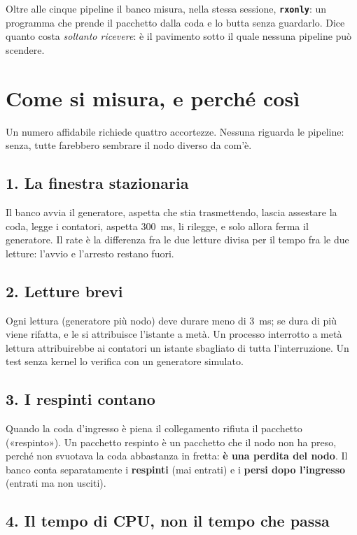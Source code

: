 \documentclass[11pt,a4paper,oneside]{report}
\begin{document}
Oltre alle cinque pipeline il banco misura, nella stessa sessione,
\textbf{\texttt{rxonly}}: un programma che prende il pacchetto dalla coda e lo
butta senza guardarlo. Dice quanto costa \emph{soltanto ricevere}: è il pavimento
sotto il quale nessuna pipeline può scendere.

\section{Come si misura, e perché così}

Un numero affidabile richiede quattro accortezze. Nessuna riguarda le pipeline:
senza, tutte farebbero sembrare il nodo diverso da com'è.

\subsection*{1. La finestra stazionaria}

Il banco avvia il generatore, aspetta che stia trasmettendo, lascia assestare la
coda, legge i contatori, aspetta 300~ms, li rilegge, e solo allora ferma il
generatore. Il rate è la differenza fra le due letture divisa per il tempo fra
le due letture: l'avvio e l'arresto restano fuori.

\subsection*{2. Letture brevi}

Ogni lettura (generatore più nodo) deve durare meno di 3~ms; se dura di più viene
rifatta, e le si attribuisce l'istante a metà. Un processo interrotto a metà
lettura attribuirebbe ai contatori un istante sbagliato di tutta l'interruzione.
Un test senza kernel lo verifica con un generatore simulato.

\subsection*{3. I respinti contano}

Quando la coda d'ingresso è piena il collegamento rifiuta il pacchetto
(«respinto»). Un pacchetto respinto è un pacchetto che il nodo non ha preso,
perché non svuotava la coda abbastanza in fretta: \textbf{è una perdita del
nodo}. Il banco conta separatamente i \textbf{respinti} (mai entrati) e i
\textbf{persi dopo l'ingresso} (entrati ma non usciti).

\subsection*{4. Il tempo di CPU, non il tempo che passa}
\end{document}
